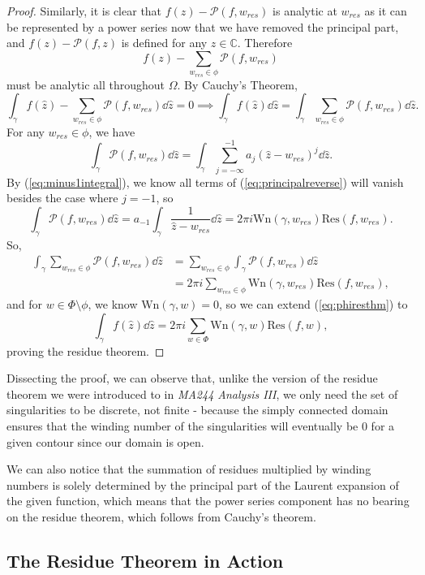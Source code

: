\documentclass[a4paper]{article}
\def\Res{\text{Res}}
\def\Wind{\text{Wn}}
\begin{document}
\begin{proof}
Similarly, it is clear that $f(z) - \mathcal{P}(f,w_{res})$ is analytic at $w_{res}$ as it can be represented by a power series now that we have removed the principal part, and $f(z) - \mathcal{P}(f,z)$ is defined for any $z\in\mathbb{C}$. Therefore
\[f(z) - \sum_{w_{res}\in\phi}\mathcal{P}(f,w_{res})\]
must be analytic all throughout $\Omega$.
By Cauchy's Theorem,
\[\int_{\gamma}f(\hat{z}) - \sum_{w_{res}\in\phi}\mathcal{P}(f,w_{res})\dd\hat{z}=0 \implies \int_{\gamma}f(\hat{z}) \dd\hat{z}= \int_{\gamma}\sum_{w_{res}\in\phi}\mathcal{P}(f,w_{res})\dd\hat{z}.\]
For any $w_{res}\in\phi$, we have
\begin{equation}\label{eq:principalreverse}\int_{\gamma}\mathcal{P}(f,w_{res})\dd\hat{z} = \int_{\gamma}\sum_{j=-\infty}^{-1} a_{j}(\hat{z}-w_{res})^{j}\dd\hat{z}. \end{equation}
By (\ref{eq:minus1integral}), we know all terms of (\ref{eq:principalreverse}) will vanish besides the case where $j=-1$, so 
\[\int_{\gamma}\mathcal{P}(f,w_{res})\dd\hat{z} = a_{-1}\int_{\gamma} \frac{1}{\hat{z}-w_{res}}\dd\hat{z}  = 2\pi i \Wind (\gamma,w_{res}) \Res (f,w_{res}).\]
So, 
\begin{align}
\int_{\gamma}\sum_{w_{res}\in\phi}\mathcal{P}(f,w_{res})\dd\hat{z} &= \sum_{w_{res}\in\phi}\int_{\gamma}\mathcal{P}(f,w_{res})\dd\hat{z} \nonumber \\
&\label{eq:phiresthm}=2\pi i \sum_{w_{res}\in\phi} \Wind (\gamma,w_{res}) \Res (f,w_{res}),
\end{align}
and for $w \in \Phi \setminus \phi$, we know $\Wind (\gamma,w)=0$, so we can extend (\ref{eq:phiresthm}) to
\[\int_{\gamma}f(\hat{z}) \dd\hat{z}=2 \pi i \sum_{w\in\Phi}\Wind (\gamma,w) \Res (f,w),\]
proving the residue theorem.
\end{proof}

Dissecting the proof, we can observe that, unlike the version of the residue theorem we were introduced to in \textit{MA244 Analysis III}, we only need the set of singularities to be discrete, not finite - because the simply connected domain ensures that the winding number of the singularities will eventually be 0 for a given contour since our domain is open. 

We can also notice that the summation of residues multiplied by winding numbers is solely determined by the principal part of the Laurent expansion of the given function, which means that the power series component has no bearing on the residue theorem, which follows from Cauchy's theorem.

\subsection{The Residue Theorem in Action}
\end{document}
